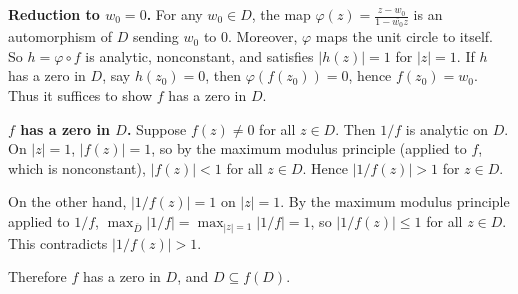 \documentclass{article}
\begin{document}
\begin{solution}
  \textbf{Reduction to $w_0 = 0$.}
  For any $w_0 \in D$, the map
  $\varphi(z) = \frac{z - w_0}{1 - \overline{w_0}z}$
  is an automorphism of $D$ sending $w_0$ to $0$.
  Moreover, $\varphi$ maps the unit circle to itself.
  So $h = \varphi \circ f$ is analytic, nonconstant, and satisfies
  $|h(z)| = 1$ for $|z| = 1$.
  If $h$ has a zero in $D$, say $h(z_0) = 0$, then
  $\varphi(f(z_0)) = 0$, hence $f(z_0) = w_0$.
  Thus it suffices to show $f$ has a zero in $D$.

  \medskip
  \textbf{$f$ has a zero in $D$.}
  Suppose $f(z) \ne 0$ for all $z \in D$.
  Then $1/f$ is analytic on $D$. On $|z| = 1$, $|f(z)| = 1$,
  so by the maximum modulus principle (applied to $f$, which is
  nonconstant), $|f(z)| < 1$ for all $z \in D$.
  Hence $|1/f(z)| > 1$ for $z \in D$.

  On the other hand, $|1/f(z)| = 1$ on $|z| = 1$.
  By the maximum modulus principle applied to $1/f$,
  $\max_{\overline{D}} |1/f| = \max_{|z|=1} |1/f| = 1$,
  so $|1/f(z)| \le 1$ for all $z \in D$.
  This contradicts $|1/f(z)| > 1$.

  Therefore $f$ has a zero in $D$, and $D \subseteq f(D)$.
\end{solution}
\end{document}
